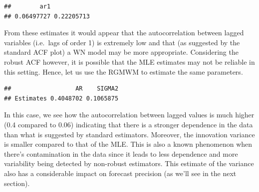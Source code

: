 \documentclass[]{book}
\newenvironment{Shaded}{\begin{snugshade}}{\end{snugshade}}
\newcommand{\KeywordTok}[1]{\textcolor[rgb]{0.13,0.29,0.53}{\textbf{#1}}}
\newcommand{\DataTypeTok}[1]{\textcolor[rgb]{0.13,0.29,0.53}{#1}}
\newcommand{\DecValTok}[1]{\textcolor[rgb]{0.00,0.00,0.81}{#1}}
\newcommand{\StringTok}[1]{\textcolor[rgb]{0.31,0.60,0.02}{#1}}
\newcommand{\CommentTok}[1]{\textcolor[rgb]{0.56,0.35,0.01}{\textit{#1}}}
\newcommand{\OtherTok}[1]{\textcolor[rgb]{0.56,0.35,0.01}{#1}}
\newcommand{\OperatorTok}[1]{\textcolor[rgb]{0.81,0.36,0.00}{\textbf{#1}}}
\newcommand{\NormalTok}[1]{#1}
\theoremstyle{definition}
\theoremstyle{definition}
\theoremstyle{definition}
\theoremstyle{remark}
\begin{document}
\begin{Shaded}
\end{Shaded}

\begin{verbatim}
##        ar1            
## 0.06497727 0.22205713
\end{verbatim}

From these estimates it would appear that the autocorrelation between
lagged variables (i.e.~lags of order 1) is extremely low and that (as
suggested by the standard ACF plot) a WN model may be more appropriate.
Considering the robust ACF however, it is possible that the MLE
estimates may not be reliable in this setting. Hence, let us use the
RGMWM to estimate the same parameters.

\begin{Shaded}
\end{Shaded}

\begin{verbatim}
##                  AR    SIGMA2
## Estimates 0.4048702 0.1065875
\end{verbatim}

In this case, we see how the autocorrelation between lagged values is
much higher (0.4 compared to 0.06) indicating that there is a stronger
dependence in the data than what is suggested by standard estimators.
Moreover, the innovation variance is smaller compared to that of the
MLE. This is also a known phenomenon when there's contamination in the
data since it leads to less dependence and more variability being
detected by non-robust estimators. This estimate of the variance also
has a considerable impact on forecast precision (as we'll see in the
next section).
\end{document}

